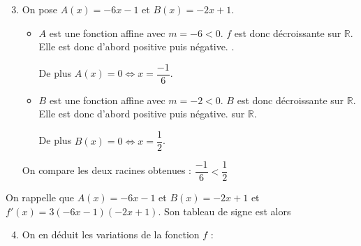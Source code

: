 \documentclass[15pt, mathserif]{beamer}
\begin{document}
 \begin{frame} 
 
 \begin{enumerate} 
 \setcounter{enumi}{2} 
 
 	 \item On pose $A(x)= -6x-1$ et $B(x) = -2x+1$.
 \bigskip 
 \begin{itemize}
	\item $A$ est une fonction affine avec $m =-6<0$. $f$ est donc décroissante sur $\mathbb{R}$. Elle est donc d'abord positive puis négative. .

	 De plus $A(x) = 0 \Leftrightarrow x = \dfrac{-1}{6}$. 
 \bigskip 
	\item $B$ est une fonction affine avec $m =-2<0$. $B$ est donc décroissante sur $\mathbb{R}$. Elle est donc d'abord positive puis négative. sur $\mathbb{R}$.

	 De plus $B(x) = 0 \Leftrightarrow x = \dfrac{1}{2}$.
\end{itemize}
 On compare les deux racines obtenues : $ \dfrac{-1}{6} < \dfrac{1}{2}$ 
 \end{enumerate} 
 
 \end{frame}


\begin{frame}On rappelle que $A(x) = -6x-1$ et $B(x) = -2x+1$ et $f'(x) = 3(-6x-1)(-2x+1)$. Son tableau de signe est alors 

\medskip \hfil
{}

 \begin{enumerate} 
 \setcounter{enumi}{3} 
 	 \item On en déduit les variations de la fonction $f$ : 

  \medskip \hfil
{}

 \end{enumerate} 
 
\end{frame}
\end{document}
